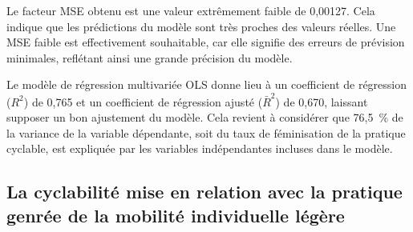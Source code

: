 \begin{refsegment}
Le facteur \acrshort{MSE} obtenu est une valeur extrêmement faible de 0,00127. Cela indique que les prédictions du modèle sont très proches des valeurs réelles. Une \acrshort{MSE} faible est effectivement souhaitable, car elle signifie des erreurs de prévision minimales, reflétant ainsi une grande précision du modèle.%

Le modèle de régression multivariée \acrshort{OLS} donne lieu à un coefficient de régression ($R^2$) de 0,765 et un coefficient de régression ajusté ($\bar{R}^2$) de 0,670, laissant supposer un bon ajustement du modèle. Cela revient à considérer que 76,5~\% de la variance de la variable dépendante, soit du taux de féminisation de la pratique cyclable, est expliquée par les variables indépendantes incluses dans le modèle.%

\subsection{La cyclabilité mise en relation avec la pratique genrée de la mobilité individuelle légère
    \label{section-chap4:cyclabilite-territoires-genre}
    }


\end{refsegment}
